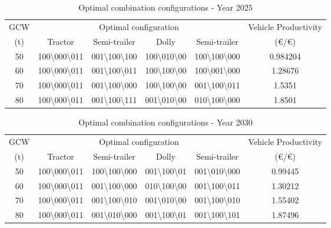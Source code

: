 \documentclass[ExampleMasters.tex]{subfiles}
\begin{document}
\begin{table}[ht]
\caption{Optimal combination configurations - Year 2025}
\centering
\begin{tabular}{c c c c c c}
\hline\hline
GCW & \multicolumn{4}{c}{Optimal configuration} & Vehicle Productivity \\ \cline{2-5}
(t) & Tractor & Semi-trailer & Dolly & Semi-trailer & (\euro/\euro)\\ 
\hline
50 & 100\textbackslash000\textbackslash011 & 001\textbackslash100\textbackslash100 & 100\textbackslash010\textbackslash00 & 100\textbackslash100\textbackslash000 & 0.984204 \\
60 & 100\textbackslash000\textbackslash011 & 001\textbackslash100\textbackslash011 & 100\textbackslash100\textbackslash00 & 100\textbackslash001\textbackslash000 & 1.28676 \\
70 & 100\textbackslash000\textbackslash011 & 001\textbackslash100\textbackslash000 & 100\textbackslash100\textbackslash00 & 001\textbackslash100\textbackslash011 & 1.5351 \\
80 & 100\textbackslash000\textbackslash011 & 001\textbackslash100\textbackslash111 & 001\textbackslash010\textbackslash00 & 010\textbackslash100\textbackslash000 & 1.8501 \\
\hline
\end{tabular}
\label{table:optComb2025}
\end{table}

\begin{table}[ht]
\caption{Optimal combination configurations - Year 2030}
\centering
\begin{tabular}{c c c c c c}
\hline\hline
GCW & \multicolumn{4}{c}{Optimal configuration} & Vehicle Productivity \\ \cline{2-5}
(t) & Tractor & Semi-trailer & Dolly & Semi-trailer & (\euro/\euro)\\ 
\hline
50 & 100\textbackslash000\textbackslash011 & 100\textbackslash100\textbackslash000 & 001\textbackslash100\textbackslash01 & 001\textbackslash010\textbackslash000 & 0.99445 \\
60 & 100\textbackslash000\textbackslash011 & 001\textbackslash100\textbackslash000 & 010\textbackslash100\textbackslash00 & 001\textbackslash100\textbackslash011 & 1.30212 \\
70 & 100\textbackslash000\textbackslash011 & 001\textbackslash100\textbackslash010 & 001\textbackslash010\textbackslash00 & 001\textbackslash100\textbackslash010 & 1.55402 \\
80 & 100\textbackslash000\textbackslash011 & 001\textbackslash010\textbackslash000 & 001\textbackslash100\textbackslash01 & 001\textbackslash100\textbackslash101 & 1.87496 \\
\hline
\end{tabular}
\label{table:optComb2030}
\end{table}
\end{document}
